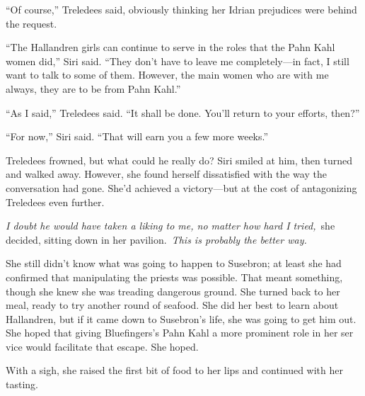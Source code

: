 “Of course,” Treledees said, obviously thinking her Idrian prejudices were behind the request.

“The Hallandren girls can continue to serve in the roles that the Pahn Kahl women did,” Siri said. “They don’t have to leave me completely—in fact, I still want to talk to some of them. However, the main women who are with me always, they are to be from Pahn Kahl.”

“As I said,” Treledees said. “It shall be done. You’ll return to your efforts, then?”

“For now,” Siri said. “That will earn you a few more weeks.”

Treledees frowned, but what could he really do? Siri smiled at him, then turned and walked away. However, she found herself dissatisfied with the way the conversation had gone. She’d achieved a victory—but at the cost of antagonizing Treledees even further.

\textit{I doubt he would have taken a liking to me, no matter how hard I tried,}~she decided, sitting down in her pavilion.~\textit{This is probably the better way.}

She still didn’t know what was going to happen to Susebron; at least she had confirmed that manipulating the priests was possible. That meant something, though she knew she was treading dangerous ground. She turned back to her meal, ready to try another round of seafood. She did her best to learn about Hallandren, but if it came down to Susebron’s life, she was going to get him out. She hoped that giving Bluefingers’s Pahn Kahl a more prominent role in her ser vice would facilitate that escape. She hoped.

With a sigh, she raised the first bit of food to her lips and continued with her tasting.

